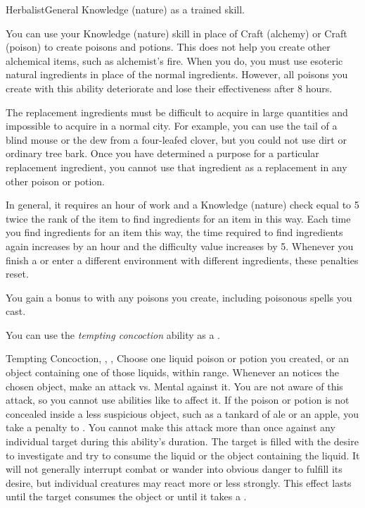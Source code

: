     \begin{feat}{Herbalist}{General}
        \featpre Knowledge (nature) as a trained skill.

         You can use your Knowledge (nature) skill in place of Craft (alchemy) or Craft (poison) to create poisons and potions.
        This does not help you create other alchemical items, such as alchemist's fire.
        When you do, you must use esoteric natural ingredients in place of the normal ingredients.
        However, all poisons you create with this ability deteriorate and lose their effectiveness after 8 hours.

        The replacement ingredients must be difficult to acquire in large quantities and impossible to acquire in a normal city.
        For example, you can use the tail of a blind mouse or the dew from a four-leafed clover, but you could not use dirt or ordinary tree bark.
        Once you have determined a purpose for a particular replacement ingredient, you cannot use that ingredient as a replacement in any other poison or potion.

        In general, it requires an hour of work and a Knowledge (nature) check equal to 5 \add twice the rank of the item to find ingredients for an item in this way.
        Each time you find ingredients for an item this way, the time required to find ingredients again increases by an hour and the difficulty value increases by 5.
        Whenever you finish a  or enter a different environment with different ingredients, these penalties reset.

         You gain a  bonus to  with any poisons you create, including poisonous spells you cast.

         You can use the \textit{tempting concoction} ability as a .
        \begin{attuneability}{Tempting Concoction}{, , , }
            \rankline
            Choose one liquid poison or potion you created, or an object containing one of those liquids, within \rngshort range.
            Whenever an  notices the chosen object, make an attack vs. Mental against it.
            You are not aware of this attack, so you cannot use abilities like  to affect it.
            If the poison or potion is not concealed inside a less suspicious object, such as a tankard of ale or an apple, you take a  penalty to .
            You cannot make this attack more than once against any individual target during this ability's duration.
            \hit The target is filled with the desire to investigate and try to consume the liquid or the object containing the liquid.
            It will not generally interrupt combat or wander into obvious danger to fulfill its desire, but individual creatures may react more or less strongly.
            This effect lasts until the target consumes the object or until it takes a .


\end{attuneability}
\end{feat}
